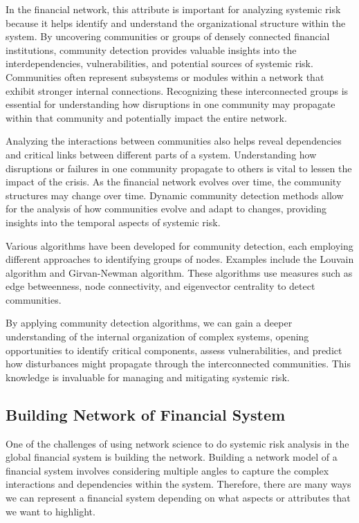 \documentclass[a4paper,11pt]{article}
\begin{document}
In the financial network, this attribute is important for analyzing systemic risk because it helps identify and understand the organizational structure within the system. By uncovering communities or groups of densely connected financial institutions, community detection provides valuable insights into the interdependencies, vulnerabilities, and potential sources of systemic risk. Communities often represent subsystems or modules within a network that exhibit stronger internal connections. Recognizing these interconnected groups is essential for understanding how disruptions in one community may propagate within that community and potentially impact the entire network.

Analyzing the interactions between communities also helps reveal dependencies and critical links between different parts of a system. Understanding how disruptions or failures in one community propagate to others is vital to lessen the impact of the crisis. As the financial network evolves over time, the community structures may change over time. Dynamic community detection methods allow for the analysis of how communities evolve and adapt to changes, providing insights into the temporal aspects of systemic risk.

Various algorithms have been developed for community detection, each employing different approaches to identifying groups of nodes. Examples include the Louvain algorithm and Girvan-Newman algorithm. These algorithms use measures such as edge betweenness, node connectivity, and eigenvector centrality to detect communities.

By applying community detection algorithms, we can gain a deeper understanding of the internal organization of complex systems, opening opportunities to identify critical components, assess vulnerabilities, and predict how disturbances might propagate through the interconnected communities. This knowledge is invaluable for managing and mitigating systemic risk.

\subsection{Building Network of Financial System}
One of the challenges of using network science to do systemic risk analysis in the global financial system is building the network. Building a network model of a financial system involves considering multiple angles to capture the complex interactions and dependencies within the system. Therefore, there are many ways we can represent a financial system depending on what aspects or attributes that we want to highlight.
\end{document}
